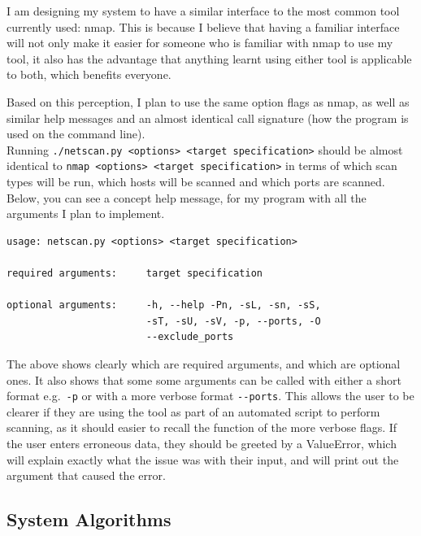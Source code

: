 \documentclass[titlepage]{article}
\let\Oldsubsection\subsection{}
\renewcommand{\subsection}{\FloatBarrier\Oldsubsection}
\begin{document}
I am designing my system to have a similar interface to the most common tool currently used: nmap.
This is because I believe that having a familiar interface will not only make it easier for someone 
who is familiar with nmap to use my tool, it also has the advantage that anything learnt using either tool 
is applicable to both, which benefits everyone.

Based on this perception, I plan to use the same option flags as nmap, as well as similar help messages 
and an almost identical call signature (how the program is used on the command line). \\
Running \verb|./netscan.py <options> <target specification>| should be almost identical to
\verb|nmap <options> <target specification>| in terms of which scan types will be run, which hosts
will be scanned and which \glspl{port} are 
scanned. Below, you can see a concept help message, for my program with all the arguments I plan to
implement.

\begin{verbatim}
usage: netscan.py <options> <target specification>

required arguments:     target specification

optional arguments:     -h, --help -Pn, -sL, -sn, -sS,
                        -sT, -sU, -sV, -p, --ports, -O
                        --exclude_ports

\end{verbatim}

The above shows clearly which are required arguments, and which are optional ones.
It also shows that some some arguments can be called with either
a short format e.g.\ \verb|-p| or with a more verbose format \verb|--ports|.
This allows the user to be clearer if they are using the tool as part of an automated
script to perform scanning, as it should easier to recall the function of the more verbose flags.
If the user enters erroneous data, they should be greeted by a ValueError,
which will explain exactly what the issue was with their input, and will print out the
argument that caused the error.

\subsection{System Algorithms}
\end{document}
